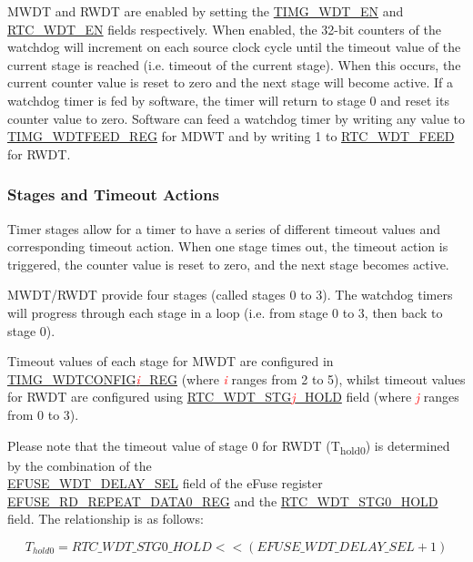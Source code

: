 \documentclass[main\_\_EN.tex]{subfiles}
\begin{document}
MWDT and RWDT are enabled by setting the \hyperref[fielddesc:TIMGWDTEN]{TIMG\_WDT\_EN} and  \hyperref[fielddesc:RTCWDTEN]{RTC\_WDT\_EN} fields respectively. When enabled, the 32-bit counters of the watchdog will increment on each source clock cycle until the timeout value of the current stage is reached (i.e. timeout of the current stage). When this occurs, the current counter value is reset to zero and the next stage will become active. If a watchdog timer is fed by software, the timer will return to stage 0 and reset its counter value to zero. Software can feed a watchdog timer by writing any value to \hyperref[regdesc:TIMGWDTFEEDREG]{TIMG\_WDTFEED\_REG} for MDWT and by writing 1 to \hyperref[fielddesc:RTCWDTFEED]{RTC\_WDT\_FEED} for RWDT.


\subsubsection{Stages and Timeout Actions}\label{sec:wdt-timeout}
Timer stages allow for a timer to have a series of different timeout values and corresponding timeout action. When one stage times out, the timeout action is triggered, the counter value is reset to zero, and the next stage becomes active.

MWDT/RWDT provide four stages (called stages 0 to 3). The watchdog timers will progress through each stage in a loop (i.e. from stage 0 to 3, then back to stage 0).

Timeout values of each stage for MWDT are configured in \hyperref[regdesc:TIMGWDTCONFIG2REG]{TIMG\_WDTCONFIG\textcolor{red}{\it{i}}\_REG} (where \textcolor{red}{\it{i}} ranges from 2 to 5), whilst timeout values for RWDT are configured using \hyperref[fielddesc:RTCWDTSTG3HOLD]{RTC\_WDT\_STG\textcolor{red}{\it{j}}\_HOLD} field (where \textcolor{red}{\it{j}} ranges from 0 to 3).

Please note that the timeout value of stage 0 for RWDT (T\textsubscript{hold0}) is determined by the combination of the \\ \hyperref[fielddesc:EFUSEWDTDELAYSEL]{EFUSE\_WDT\_DELAY\_SEL} field of the eFuse register \hyperref[regdesc:EFUSERDREPEATDATA0REG]{EFUSE\_RD\_REPEAT\_DATA0\_REG} and the \hyperref[fielddesc:RTCWDTSTG0HOLD]{RTC\_WDT\_STG0\_HOLD} field. The relationship is as follows:

\begin{displaymath}
T_{hold0} = \hyperref[fielddesc:RTCWDTSTG0HOLD]{RTC\_WDT\_STG0\_HOLD}   << (\hyperref[fielddesc:EFUSEWDTDELAYSEL]{EFUSE\_WDT\_DELAY\_SEL} + 1)
\end{displaymath}
\end{document}

